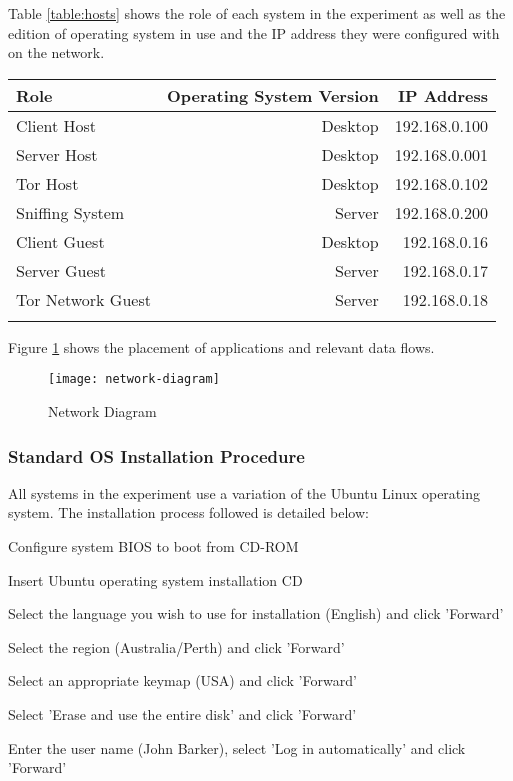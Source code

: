 Table \ref{table:hosts} shows the role of each system in the experiment as well
as the edition of operating system in use and the IP address they were
configured with on the network.

\begin{tabular}{lrr}
  \toprule
  Role & Operating System Version & IP Address\\
  \midrule
  Client Host & Desktop & 192.168.0.100\\
  Server Host & Desktop & 192.168.0.001\\
  Tor Host & Desktop & 192.168.0.102\\
  \midrule
  Sniffing System & Server & 192.168.0.200\\
  \midrule
  Client Guest & Desktop & 192.168.0.16\\
  Server Guest & Server & 192.168.0.17\\
  Tor Network Guest & Server & 192.168.0.18\\
  \bottomrule
  \label{table:hosts}
\end{tabular}

Figure \ref{network-diagram} shows the placement of applications and relevant
data flows.

\begin{figure}[H]
  \centering\texttt{[image: network-diagram]}
  \caption{Network Diagram}
  \label{network-diagram}
\end{figure}

\subsubsection{Standard OS Installation Procedure}
\label{section:os_install}

All systems in the experiment use a variation of the Ubuntu Linux operating
system. The installation process followed is detailed below:

\begin{enumerate*}
  \item Configure system BIOS to boot from CD-ROM
  \item Insert Ubuntu operating system installation CD
  \item Select the language you wish to use for installation (English) and click
    'Forward'
  \item Select the region (Australia/Perth) and click 'Forward'
  \item Select an appropriate keymap (USA) and click 'Forward'
  \item Select 'Erase and use the entire disk' and click 'Forward'
  \item Enter the user name (John Barker), select 'Log in automatically' and click 'Forward'
\end{enumerate*}

